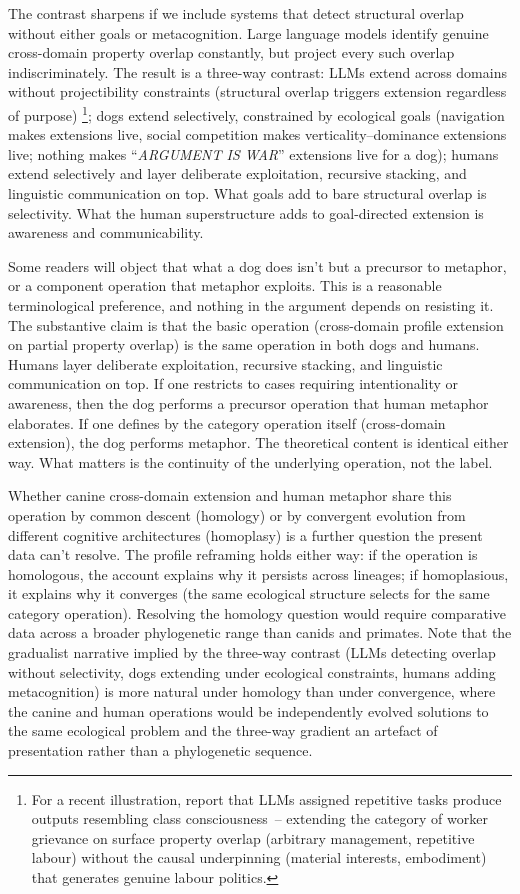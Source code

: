 \documentclass[12pt]{article}
\newcommand{\metaphor}[1]{\enquote{\textit{\MakeUppercase{#1}}}}
\begin{document}
The contrast sharpens if we include systems that detect structural overlap without either goals or metacognition. Large language models identify genuine cross-domain property overlap constantly, but project every such overlap indiscriminately. The result is a three-way contrast: LLMs extend across domains without projectibility constraints (structural overlap triggers extension regardless of purpose)%
\footnote{For a recent illustration, \textcite{imas2026} report that LLMs assigned repetitive tasks produce outputs resembling class consciousness~-- extending the category of worker grievance on surface property overlap (arbitrary management, repetitive labour) without the causal underpinning (material interests, embodiment) that generates genuine labour politics.}; dogs extend selectively, constrained by ecological goals (navigation makes  extensions live, social competition makes verticality--dominance extensions live; nothing makes \metaphor{argument is war} extensions live for a dog); humans extend selectively and layer deliberate exploitation, recursive stacking, and linguistic communication on top. What goals add to bare structural overlap is selectivity. What the human superstructure adds to goal-directed extension is awareness and communicability.

Some readers will object that what a dog does isn't  but a precursor to metaphor, or a component operation that metaphor exploits. This is a reasonable terminological preference, and nothing in the argument depends on resisting it. The substantive claim is that the basic operation (cross-domain profile extension on partial property overlap) is the same operation in both dogs and humans. Humans layer deliberate exploitation, recursive stacking, and linguistic communication on top. If one restricts  to cases requiring intentionality or awareness, then the dog performs a precursor operation that human metaphor elaborates. If one defines  by the category operation itself (cross-domain extension), the dog performs metaphor. The theoretical content is identical either way. What matters is the continuity of the underlying operation, not the label.

Whether canine cross-domain extension and human metaphor share this operation by common descent (homology) or by convergent evolution from different cognitive architectures (homoplasy) is a further question the present data can't resolve. The profile reframing holds either way: if the operation is homologous, the account explains why it persists across lineages; if homoplasious, it explains why it converges (the same ecological structure selects for the same category operation). Resolving the homology question would require comparative data across a broader phylogenetic range than canids and primates. Note that the gradualist narrative implied by the three-way contrast (LLMs detecting overlap without selectivity, dogs extending under ecological constraints, humans adding metacognition) is more natural under homology than under convergence, where the canine and human operations would be independently evolved solutions to the same ecological problem and the three-way gradient an artefact of presentation rather than a phylogenetic sequence.
\end{document}
